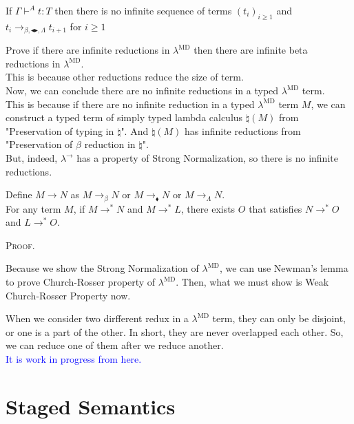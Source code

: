 \documentclass[9pt, a4paper]{extarticle}
\theoremstyle{break}
\newcommand{\G}{\Gamma}
\newcommand{\V}{\vdash}
\newcommand{\TB}{\blacktriangleright}
\newcommand{\TBL}{\blacktriangleleft}
\newcommand{\blue}[1]{\textcolor{blue}{ #1 }}
\begin{document}
\begin{thm}
    If $\G\V^A t:T$ then there is no infinite sequence of terms $(t_i)_{i\ge1}$ and $t_i \longrightarrow_{\beta, \TBL \TB,\Lambda} t_{i+1}$ for $i\ge 1$
\end{thm}

Prove if there are infinite reductions in $\lambda^{\text{MD}}$ then there are infinite beta reductions in $\lambda^{\text{MD}}$.\\
This is because other reductions reduce the size of term.\\

Now, we can conclude there are no infinite reductions in a typed $\lambda^{\text{MD}}$ term. \\

This is because if there are no infinite reduction in a typed $\lambda^{\text{MD}}$ term $M$,
we can construct a typed term of simply typed lambda calculus $\natural(M)$ from "Preservation of typing in $\natural$".
And $\natural(M)$ has infinite reductions from "Preservation of $\beta$ reduction in $\natural$".\\

But, indeed, $\lambda^\to$ has a property of Strong Normalization, so there is no infinite reductions.

\begin{thm}
    Define $M \longrightarrow N$ as $M \longrightarrow_{\beta} N$ or $M\longrightarrow_\blacklozenge N$ or  $M \longrightarrow_{\Lambda} N$.\\
    For any term $M$, if $M \longrightarrow^* N$ and $M \longrightarrow^* L$,
    there exists $O$ that satisfies $N \longrightarrow^* O$ and $L \longrightarrow^* O$.
\end{thm}

\textsc{Proof.}

Because we show the Strong Normalization of $\lambda^{\text{MD}}$, we can use Newman's lemma to prove Church-Rosser property of $\lambda^{\text{MD}}$.
Then, what we must show is Weak Church-Rosser Property now.

When we consider two dirfferent redux in a $\lambda^{\text{MD}}$ term, they can only be disjoint, or one is a part of the other.
In short, they are never overlapped each other.
So, we can reduce one of them after we reduce another.\\

\blue{\huge{It is work in progress from here.}}

\section{ Staged Semantics }
\end{document}
